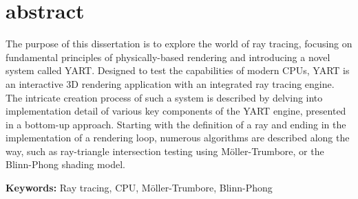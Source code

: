 
\chapter*{abstract}

The purpose of this dissertation is to explore the world of ray tracing, focusing on fundamental principles of physically-based rendering and introducing a novel system called YART.
Designed to test the capabilities of modern CPUs, YART is an interactive 3D rendering application with an integrated ray tracing engine. 
The intricate creation process of such a system is described by delving into implementation detail of various key components of the YART engine, presented in a bottom-up approach.
Starting with the definition of a ray and ending in the implementation of a rendering loop, numerous algorithms are described along the way, such as ray-triangle intersection testing using M{\"o}ller-Trumbore, or the Blinn-Phong shading model. 

\vspace*{1em}

\noindent\textbf{Keywords:} Ray tracing, CPU, M{\"o}ller-Trumbore, Blinn-Phong

\clearpage
